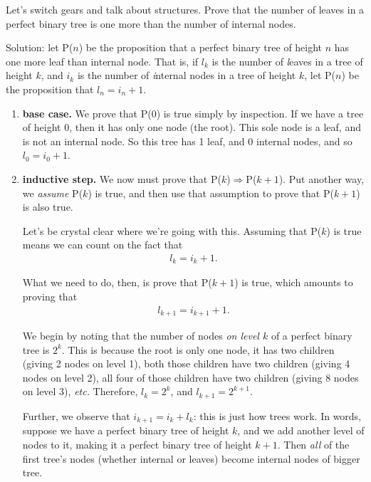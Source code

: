 Let's switch gears and talk about structures. Prove that the number of
leaves in a perfect binary tree is one more than the number of internal
nodes.

Solution: let P($n$) be the proposition that a perfect binary tree of
height $n$ has one more leaf than internal node. That is, if $l_k$ is the
number of \textit{l}eaves in a tree of height $k$, and $i_k$ is the number of
\textit{i}nternal nodes in a tree of height $k$, let P($n$) be the
proposition that $l_n = i_n + 1$.

\begin{enumerate}
\item \textbf{base case.} We prove that P(0) is true simply by inspection.
If we have a tree of height 0, then it has only one node (the root). This
sole node is a leaf, and is not an internal node. So this tree has 1 leaf,
and 0 internal nodes, and so $l_0 = i_0 + 1$. \quad \checkmark

\item \textbf{inductive step.}
We now must prove that P($k$)$\Rightarrow$P($k+1$). Put another way, we
\textit{assume} P($k$) is true, and then use that assumption to prove that
P($k+1$) is also true.

Let's be crystal clear where we're going with this. Assuming that P($k$) is
true means we can count on the fact that
\begin{align*}
l_k = i_k + 1.
\end{align*}

What we need to do, then, is prove that P($k+1$) is true, which amounts to
proving that
\begin{align*}
l_{k+1} = i_{k+1} + 1.
\end{align*}

We begin by noting that the number of nodes \textit{on level $k$} of a perfect
binary tree is $2^k$. This is because the root is only one node, it has two
children (giving 2 nodes on level 1), both those children have two children
(giving 4 nodes on level 2), all four of those children have two children
(giving 8 nodes on level 3), \textit{etc.} Therefore, $l_k = 2^k$, and
$l_{k+1} = 2^{k+1}$.

Further, we observe that $i_{k+1} = i_k + l_k$: this is just how trees
work. In words, suppose we have a perfect binary tree of height $k$, and we
add another level of nodes to it, making it a perfect binary tree of height
$k+1$. Then \textit{all} of the first tree's nodes (whether internal or
leaves) become internal nodes of bigger tree.


\end{enumerate}
